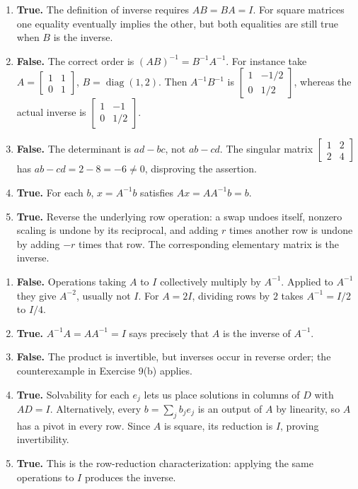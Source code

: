 \begin{enumerate}[label=(\alph*)]
\item \textbf{True.} The definition of inverse requires $AB=BA=I$.
For square matrices one equality eventually implies the other, but both
equalities are still true when $B$ is the inverse.
\item \textbf{False.} The correct order is $(AB)^{-1}=B^{-1}A^{-1}$.
For instance take $A=\begin{bmatrix}1&1\\0&1\end{bmatrix}$,
$B=\operatorname{diag}(1,2)$. Then $A^{-1}B^{-1}$ is
$\begin{bmatrix}1&-1/2\\0&1/2\end{bmatrix}$, whereas the actual inverse
is $\begin{bmatrix}1&-1\\0&1/2\end{bmatrix}$.
\item \textbf{False.} The determinant is $ad-bc$, not $ab-cd$.
The singular matrix $\begin{bmatrix}1&2\\2&4\end{bmatrix}$ has
$ab-cd=2-8=-6\ne0$, disproving the assertion.
\item \textbf{True.} For each $b$, $x=A^{-1}b$ satisfies
$Ax=AA^{-1}b=b$.
\item \textbf{True.} Reverse the underlying row operation: a swap
undoes itself, nonzero scaling is undone by its reciprocal, and adding
$r$ times another row is undone by adding $-r$ times that row.
The corresponding elementary matrix is the inverse.
\end{enumerate}

\begin{enumerate}[label=(\alph*)]
\item \textbf{False.} Operations taking $A$ to $I$ collectively multiply
by $A^{-1}$. Applied to $A^{-1}$ they give $A^{-2}$, usually not $I$.
For $A=2I$, dividing rows by $2$ takes $A^{-1}=I/2$ to $I/4$.
\item \textbf{True.} $A^{-1}A=AA^{-1}=I$ says precisely that $A$
is the inverse of $A^{-1}$.
\item \textbf{False.} The product is invertible, but inverses occur
in reverse order; the counterexample in Exercise 9(b) applies.
\item \textbf{True.} Solvability for each $e_j$ lets us place solutions
in columns of $D$ with $AD=I$. Alternatively, every $b=\sum_jb_je_j$
is an output of $A$ by linearity, so $A$ has a pivot in every row.
Since $A$ is square, its reduction is $I$, proving invertibility.
\item \textbf{True.} This is the row-reduction characterization:
applying the same operations to $I$ produces the inverse.
\end{enumerate}


